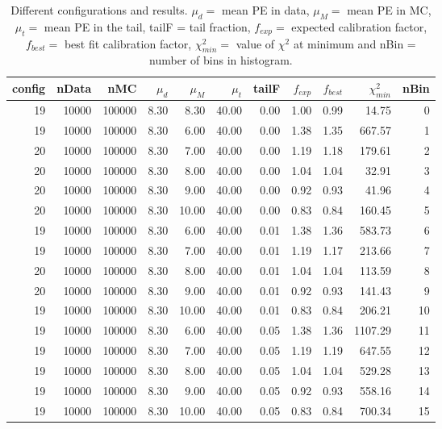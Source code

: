 \begin{table}[htp] 
\begin{center} 
\begin{tabular}{|r|rr| rr| rr| rr| rr|} 
\hline 
config& nData&   nMC&$\mu_d$&$\mu_M$&$\mu_t$& tailF&$f_{exp}$&$f_{best}$&$\chi^2_{min}$&  nBin \\ 
\hline 
    19& 10000&100000&  8.30&  8.30& 40.00&  0.00&  1.00&  0.99& 14.75&     0 \\ 
    19& 10000&100000&  8.30&  6.00& 40.00&  0.00&  1.38&  1.35&667.57&     1 \\ 
    20& 10000&100000&  8.30&  7.00& 40.00&  0.00&  1.19&  1.18&179.61&     2 \\ 
    20& 10000&100000&  8.30&  8.00& 40.00&  0.00&  1.04&  1.04& 32.91&     3 \\ 
    20& 10000&100000&  8.30&  9.00& 40.00&  0.00&  0.92&  0.93& 41.96&     4 \\ 
    20& 10000&100000&  8.30& 10.00& 40.00&  0.00&  0.83&  0.84&160.45&     5 \\ 
    19& 10000&100000&  8.30&  6.00& 40.00&  0.01&  1.38&  1.36&583.73&     6 \\ 
    19& 10000&100000&  8.30&  7.00& 40.00&  0.01&  1.19&  1.17&213.66&     7 \\ 
    20& 10000&100000&  8.30&  8.00& 40.00&  0.01&  1.04&  1.04&113.59&     8 \\ 
    20& 10000&100000&  8.30&  9.00& 40.00&  0.01&  0.92&  0.93&141.43&     9 \\ 
    19& 10000&100000&  8.30& 10.00& 40.00&  0.01&  0.83&  0.84&206.21&    10 \\ 
    19& 10000&100000&  8.30&  6.00& 40.00&  0.05&  1.38&  1.36&1107.29&    11 \\ 
    19& 10000&100000&  8.30&  7.00& 40.00&  0.05&  1.19&  1.19&647.55&    12 \\ 
    19& 10000&100000&  8.30&  8.00& 40.00&  0.05&  1.04&  1.04&529.28&    13 \\ 
    19& 10000&100000&  8.30&  9.00& 40.00&  0.05&  0.92&  0.93&558.16&    14 \\ 
    19& 10000&100000&  8.30& 10.00& 40.00&  0.05&  0.83&  0.84&700.34&    15 \\ 
\hline 
\end{tabular} 
\label{tab:results} 
\caption{Different configurations and results. $\mu_d = $ mean PE in data, $\mu_M =$ mean PE in MC, $\mu_t = $ mean PE in the tail, tailF = tail fraction, $f_{exp}=$ expected calibration factor, $f_{best} =$ best fit calibration factor, $\chi^2_{min} = $ value of $\chi^2$ at minimum and nBin = number of bins in histogram.} 
\end{center} 
\end{table} 
